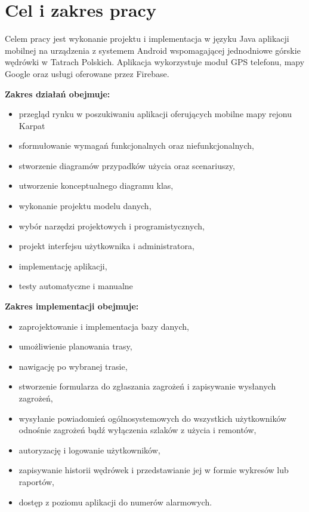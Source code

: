 \section{Cel i zakres pracy}

    Celem pracy jest wykonanie projektu i implementacja w języku Java aplikacji mobilnej na urządzenia z systemem Android wspomagającej jednodniowe górskie wędrówki w Tatrach Polskich. Aplikacja wykorzystuje moduł GPS telefonu, mapy Google oraz usługi oferowane przez Firebase.


    \vspace{0.5cm}
    \noindent
    \textbf{Zakres działań obejmuje:}
    \begin{itemize}
        \item przegląd rynku w poszukiwaniu aplikacji oferujących mobilne mapy rejonu Karpat
        \item sformułowanie wymagań funkcjonalnych oraz niefunkcjonalnych, 
        \item stworzenie diagramów przypadków użycia oraz scenariuszy,  
        \item utworzenie konceptualnego diagramu klas, 
        \item wykonanie projektu modelu danych,
        \item wybór narzędzi projektowych i programistycznych, 
        \item projekt interfejsu użytkownika i administratora,
        \item implementację aplikacji,
        \item testy automatyczne i manualne
    \end{itemize}
    \textbf{Zakres implementacji obejmuje:}
    \begin{itemize}
        \item zaprojektowanie i implementacja bazy danych,
        \item umożliwienie planowania trasy,
        \item nawigację po wybranej trasie,
        \item stworzenie formularza do zgłaszania zagrożeń i zapisywanie wysłanych zagrożeń,
        \item wysyłanie powiadomień ogólnosystemowych do wszystkich użytkowników odnośnie zagrożeń bądź wyłączenia szlaków z użycia i remontów,
        \item autoryzację i logowanie użytkowników,
        \item zapisywanie historii wędrówek i przedstawianie jej w formie wykresów lub raportów,
        \item dostęp z poziomu aplikacji do numerów alarmowych.
    \end{itemize}
